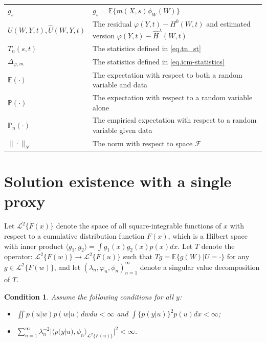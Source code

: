 \documentclass[
  12pt]{article}
\newtheorem{assumption}{Condition}
\def\to{\rightarrow}
\def\wh{\widehat}
\def\cF{\mathcal{F}}
\begin{document}
{\begin{longtable}{ >{\centering\arraybackslash}m{3.4cm} | >{\centering\arraybackslash}m{12.2cm} }
$g_s$ & $g_s=\mathbb{E} \{ m(X,s)\phi_W(W) \}$  \\

$U(W,Y,t),\wh{U}(W,Y,t)$ & The residual $\varphi(Y,t)-H^0(W,t)$ and estimated version $\varphi(Y,t)-\wh{H}^{\lambda}(W,t)$ \\

$T_n(s,t)$ & The statistics  defined in \eqref{eq.tn_st}\\

$\Delta_{\varphi,m}$ & The statistics defined in \eqref{eq.icm-statistics}\\

\hline

\hline
$\mathbb{E}(\cdot)$ & The expectation with respect to both a random variable and data\\

$\mathbb{P}(\cdot)$ & The expectation with respect to  a random variable alone\\

$\mathbb{P}_n(\cdot)$ & The empirical expectation with respect to a random variable given data\\

$\|\cdot\|_{\cF}$ & The norm with respect to space $\cF$\\
   
\end{longtable}
}
\section{Solution existence with a single proxy}
\label{appx.existence}
Let $\mathcal{L}^2\{F(x)\}$ denote the space of all square-integrable functions of $x$ with respect to a cumulative distribution function $F(x)$, which is a Hilbert space with inner product $\langle g_1,g_2\rangle=\int g_1(x)g_2(x)p(x)dx$. Let $T$ denote the operator: $\mathcal{L}^2\{F(w)\}\to \mathcal{L}^2\{F(u)\}$ such that  $Tg=\mathbb{E}\{g(W)|U=\cdot\}$ for any $g \in \mathcal{L}^2\{F(w)\}$, and let $(\lambda_{n},\varphi_{n},\phi_{n})_{n=1}^{\infty}$ denote a singular value decomposition of $T$. 

\begin{assumption}\label{assum.regularity condition}
     Assume the following conditions for all $y$: 
\begin{itemize}
   \item[(1)] $\iint p(u|w)p(w|u)dwdu<\infty $ and $ \int\{p(y|u)\}^2p(u)dx<\infty $;
    \item[(2)] $\sum_{n=1}^{\infty}\lambda_{n}^{-2}|\langle p(y|u),\phi_{n}\rangle_{\mathcal{L}^2\{F(u)\}}|^{2}<\infty$.
    \end{itemize} 
\end{assumption}
\end{document}

